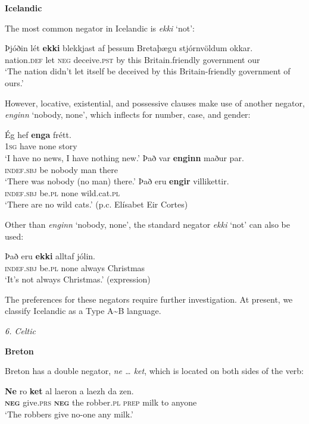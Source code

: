 ﻿\documentclass[output=paper]{langsci/langscibook}
\begin{document}
\begin{unindented}
\textbf{Icelandic}

The most common negator in Icelandic is \textit{ekki} `not': 
%
\begin{exe}\ex \gll Þjóðin lét   \textbf{ekki}   blekkjast   af   þessum
Bretaþægu stjórnvöldum   okkar. \\
nation.\textsc{def} let \textsc{neg} deceive.\textsc{pst} by this   
Britain.friendly   government our \\
    \glt `The nation didn't let itself be deceived by this Britain-friendly government of ours.' \citep[286]{Wood2012}
    \end{exe}

However, locative, existential, and possessive clauses make use of another negator, \textit{enginn} `nobody, none', which inflects for number, case, and gender: 
%
\begin{exe}\ex \gll Ég   hef    \textbf{enga} frétt. \\
\textsc{1sg} have none story \\
    \glt `I have no news, I have nothing new.' \citep[62]{Bjarnason1998}
\ex \gll Það var \textbf{enginn}  maður par. \\
\textsc{indef.sbj} be   nobody man    there \\
    \glt `There was nobody (no man) there.' \citet[123]{Einarsson1949} 
\ex \gll Það eru    \textbf{engir} villikettir. \\
\textsc{indef.sbj} be.\textsc{pl} none   wild.cat.\textsc{pl} \\
    \glt `There are no wild cats.' (p.c. Elísabet Eir Cortes)
    \end{exe}

Other than \textit{enginn} `nobody, none', the standard negator \textit{ekki} `not' can also be used:
%
\begin{exe}\ex \gll Það eru \textbf{ekki} alltaf    jólin. \\
\textsc{indef.sbj} be.\textsc{pl} none always Christmas \\
    \glt `It's not always Christmas.' (expression)
    \end{exe}

The preferences for these negators require further investigation.  At present, we classify Icelandic as a Type A{\textasciitilde}B language. 

\textit{6. Celtic}

\textbf{Breton}

Breton has a double negator, \textit{ne … ket}, which is located on both sides of the verb:
%
\begin{exe}\ex \gll \textbf{Ne} ro \textbf{ket}   al  laeron a laezh da zen. \\
\textbf{\textsc{neg}} give.\textsc{prs} \textbf{\textsc{neg}} the robber.\textsc{pl} \textsc{prep} milk   to anyone \\
    \glt `The robbers give no-one any milk.' \citet[126]{Press1986}
    \end{exe}


\end{unindented}
\end{document}
